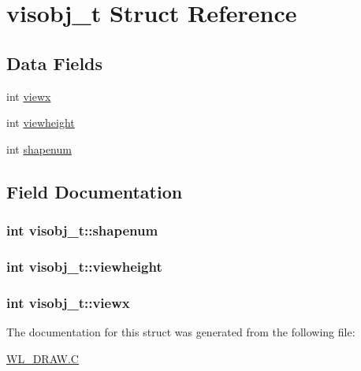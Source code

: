 \hypertarget{structvisobj__t}{
\section{visobj\_\-t Struct Reference}
\label{structvisobj__t}
}
\subsection*{Data Fields}
\begin{DoxyCompactItemize}
\item 
int \hyperlink{structvisobj__t_a2eb467610dd2c4c060c6ccc9706b0485}{viewx}
\item 
int \hyperlink{structvisobj__t_afa1871b32570615f719d4ca3b73cdf70}{viewheight}
\item 
int \hyperlink{structvisobj__t_a59674f7c8a6c6a242ee6a588a26eef74}{shapenum}
\end{DoxyCompactItemize}


\subsection{Field Documentation}
\hypertarget{structvisobj__t_a59674f7c8a6c6a242ee6a588a26eef74}{
\subsubsection[{shapenum}]{\setlength{\rightskip}{0pt plus 5cm}int {\bf visobj\_\-t::shapenum}}}
\label{structvisobj__t_a59674f7c8a6c6a242ee6a588a26eef74}
\hypertarget{structvisobj__t_afa1871b32570615f719d4ca3b73cdf70}{
\subsubsection[{viewheight}]{\setlength{\rightskip}{0pt plus 5cm}int {\bf visobj\_\-t::viewheight}}}
\label{structvisobj__t_afa1871b32570615f719d4ca3b73cdf70}
\hypertarget{structvisobj__t_a2eb467610dd2c4c060c6ccc9706b0485}{
\subsubsection[{viewx}]{\setlength{\rightskip}{0pt plus 5cm}int {\bf visobj\_\-t::viewx}}}
\label{structvisobj__t_a2eb467610dd2c4c060c6ccc9706b0485}


The documentation for this struct was generated from the following file:\begin{DoxyCompactItemize}
\item 
\hyperlink{WL__DRAW_8C}{WL\_\-DRAW.C}\end{DoxyCompactItemize}
